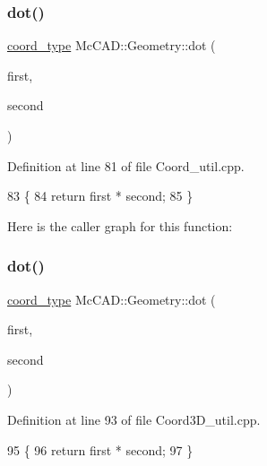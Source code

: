 \subsubsection{\texorpdfstring{dot()}{dot()}\hspace{0.1cm}{\footnotesize\ttfamily [2/3]}}
{\footnotesize\ttfamily \hyperlink{namespaceMcCAD_1_1Geometry_ac043b37a4a7e849fca22869e1982d2f8}{coord\+\_\+type} Mc\+C\+A\+D\+::\+Geometry\+::dot (\begin{DoxyParamCaption}\item[{const \hyperlink{classMcCAD_1_1Geometry_1_1Coord}{Coord} \&}]{first,  }\item[{const \hyperlink{classMcCAD_1_1Geometry_1_1Coord}{Coord} \&}]{second }\end{DoxyParamCaption})}



Definition at line 81 of file Coord\+\_\+util.\+cpp.


\begin{DoxyCode}
83                             \{
84     \textcolor{keywordflow}{return} first * second;
85 \}
\end{DoxyCode}
Here is the caller graph for this function\+:
\mbox{\label{namespaceMcCAD_1_1Geometry_aaea589ff80c14f357e88a55f5c0da561}} 
\subsubsection{\texorpdfstring{dot()}{dot()}\hspace{0.1cm}{\footnotesize\ttfamily [3/3]}}
{\footnotesize\ttfamily \hyperlink{namespaceMcCAD_1_1Geometry_ac043b37a4a7e849fca22869e1982d2f8}{coord\+\_\+type} Mc\+C\+A\+D\+::\+Geometry\+::dot (\begin{DoxyParamCaption}\item[{const \hyperlink{classMcCAD_1_1Geometry_1_1Coord3D}{Coord3D} \&}]{first,  }\item[{const \hyperlink{classMcCAD_1_1Geometry_1_1Coord3D}{Coord3D} \&}]{second }\end{DoxyParamCaption})}



Definition at line 93 of file Coord3\+D\+\_\+util.\+cpp.


\begin{DoxyCode}
95                               \{
96     \textcolor{keywordflow}{return} first * second;
97 \}
\end{DoxyCode}
\mbox{\label{namespaceMcCAD_1_1Geometry_ab34c80e280caaad281b88d58940425af}} 

